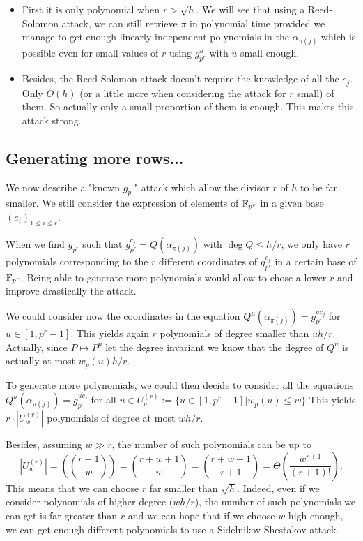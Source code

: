\documentclass[12pt,a4paper,titlepage]{article}
\begin{document}
\begin{itemize}
\item First it is only polynomial when $r > \sqrt{h}$. We will see that using a Reed-Solomon attack, we can still retrieve $\pi$ in polynomial time provided we manage to get enough linearly independent polynomials in the $\alpha_{\pi(j)}$ which is possible even for small values of $r$ using $g_{p^r}^u$ with $u$ small enough.
\item Besides, the Reed-Solomon attack doesn't require the knowledge of all the $c_j$. Only $O(h)$ (or a little more when considering the attack for $r$ small) of them. So actually only a small proportion of them is enough. This makes this attack strong.
\end{itemize}




\subsection{Generating more rows...}

We now describe a "known $g_{p^r}$" attack which allow the divisor $r$ of $h$ to be far smaller.
We still consider the expression of elements of $\mathbb{F}_{p^r}$ in a given base $(e_i)_{1 \leq i \leq r}$.


When we find $g_{p^r}$ such that $g_{p^r}^{c_j} = Q(\alpha_{\pi(j)})$ with $\deg Q \leq h/r$, we only have $r$ polynomials corresponding to the $r$ different coordinates of $g_{p^r}^{c_j}$ in a certain base of $\mathbb{F}_{p^r}$. Being able to generate more polynomials would allow to chose a lower $r$ and improve drastically the attack.

We could consider now the coordinates in the equation $Q^u(\alpha_{\pi(j)}) = g_{p^r}^{u c_j}$ for $u \in [1,p^r-1]$. This yields again $r$ polynomials of degree smaller than $u h/r$. Actually, since $P \mapsto P^p$ let the degree invariant we know that the degree of $Q^u$ is actually at most $w_p(u) h / r$.

To generate more polynomials, we could then decide to consider all the equations $Q^u(\alpha_{\pi(j)}) = g_{p^r}^{u c_j}$ for all $u \in U_w^{(r)} := \{ u \in [1,p^r-1] | w_p(u) \leq w \}$
This yields $r \cdot |U_w^{(r)}|$ polynomials of degree at most $wh/r$.

Besides, assuming $w \gg r$, the number of such polynomials can be up to
$$ | U_w^{(r)} | = \left( \binom{r+1}{w} \right) = \binom{r+w+1}{w} = \binom{r+w+1}{r+1} = \Theta\left(\frac{w^{r+1}}{(r+1)!}\right) .$$
This means that we can choose $r$ far smaller than $\sqrt{h}$. Indeed, even if we consider polynomials of higher degree ($wh/r$), the number of such polynomials we can get is far greater than $r$ and we can hope that if we choose $w$ high enough, we can get enough different polynomials to use a Sidelnikov-Shestakov attack.
\end{document}
